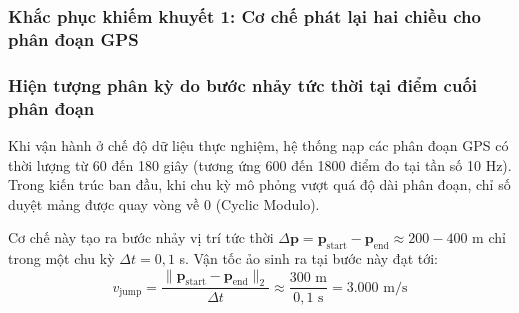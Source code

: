 \begin{table}[H]
\centering
\caption{Phân loại hệ thống 6 khiếm khuyết tính chân thực quỹ đạo và giải pháp xử lý}
\label{tab:six-realism-issues-taxonomy}
\end{table}

\subsubsection{Khắc phục khiếm khuyết 1: Cơ chế phát lại hai chiều cho phân đoạn GPS}

\subsubsection{Hiện tượng phân kỳ do bước nhảy tức thời tại điểm cuối phân đoạn}

\hspace{0.5cm} Khi vận hành ở chế độ dữ liệu thực nghiệm, hệ thống nạp các phân đoạn GPS có thời lượng từ 60 đến 180 giây (tương ứng 600 đến 1800 điểm đo tại tần số 10 Hz). Trong kiến trúc ban đầu, khi chu kỳ mô phỏng vượt quá độ dài phân đoạn, chỉ số duyệt mảng được quay vòng về 0 (Cyclic Modulo).

Cơ chế này tạo ra bước nhảy vị trí tức thời $\Delta \mathbf{p} = \mathbf{p}_{\text{start}} - \mathbf{p}_{\text{end}} \approx 200 - 400$ m chỉ trong một chu kỳ $\Delta t = 0{,}1$ s. Vận tốc ảo sinh ra tại bước này đạt tới:
\begin{equation}
v_{\text{jump}} = \frac{\|\mathbf{p}_{\text{start}} - \mathbf{p}_{\text{end}}\|_2}{\Delta t} \approx \frac{300\text{ m}}{0{,}1\text{ s}} = 3.000\text{ m/s}
\label{eq:teleportation-virtual-velocity}
\end{equation}

